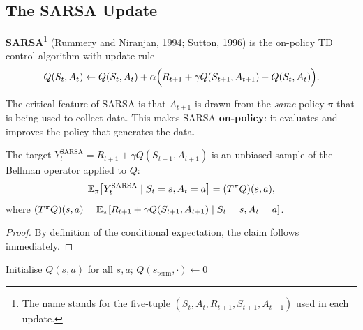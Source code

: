 \subsection{The SARSA Update}

\begin{definition}[SARSA]
\label{def:sarsa}
\textbf{SARSA}\footnote{The name stands for the five-tuple $(S_t, A_t, R_{t+1}, S_{t+1}, A_{t+1})$ used in each update.} (Rummery and Niranjan, 1994; Sutton, 1996) is the on-policy TD control algorithm with update rule
\begin{equation}
\label{eq:sarsa}
Q(S_t,A_t) \leftarrow Q(S_t,A_t) + \alpha\Bigl(R_{t+1} + \gamma Q(S_{t+1},A_{t+1}) - Q(S_t,A_t)\Bigr).
\end{equation}
\end{definition}

The critical feature of SARSA is that $A_{t+1}$ is drawn from the \emph{same} policy $\pi$ that is being used to collect data.  This makes SARSA \textbf{on-policy}: it evaluates and improves the policy that generates the data.

\begin{proposition}
The target $Y_t^{\mathrm{SARSA}} = R_{t+1} + \gamma Q(S_{t+1},A_{t+1})$ is an unbiased sample of the Bellman operator applied to $Q$:
\[
\operatorname{\mathbb{E}}_\pi\bigl[Y_t^{\mathrm{SARSA}} \mid S_t=s, A_t=a\bigr] = (T^\pi Q)(s,a),
\]
where $(T^\pi Q)(s,a) = \operatorname{\mathbb{E}}_\pi[R_{t+1}+\gamma Q(S_{t+1},A_{t+1}) \mid S_t=s, A_t=a]$.
\end{proposition}

\begin{proof}
By definition of the conditional expectation, the claim follows immediately.
\end{proof}

\begin{algorithm}[ht]
\caption{SARSA (On-Policy TD Control)}
\label{alg:sarsa}
Initialise $Q(s,a)$ for all $s,a$; $Q(s_{\mathrm{term}},\cdot)\leftarrow 0$\;
\end{algorithm}

